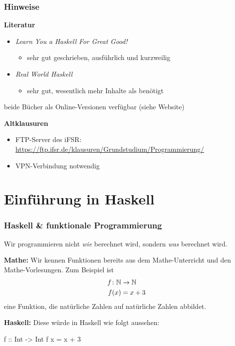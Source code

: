 \documentclass{beamer}
\begin{document}
	\begin{frame} \frametitle{Hinweise}
		\footnotesize
		\textbf{Literatur}
		\begin{itemize}
			\item \textit{Learn You a Haskell For Great Good!}
			\begin{itemize}
				\item sehr gut geschrieben, ausführlich und kurzweilig
			\end{itemize}
			\item \textit{Real World Haskell}
			\begin{itemize}
				\item sehr gut, wesentlich mehr Inhalte als benötigt
			\end{itemize}
		\end{itemize}
		beide Bücher als Online-Versionen verfügbar (siehe Website)
		
		\medskip \pause
		
		\textbf{Altklausuren}
		\begin{itemize}
			\item FTP-Server des iFSR:
			\url{https://ftp.ifsr.de/klausuren/Grundstudium/Programmierung/}
			\item VPN-Verbindung notwendig
		\end{itemize}
	\end{frame}

\section{Einführung in Haskell}

    \begin{frame}[fragile] \frametitle{Haskell \& funktionale Programmierung}
    	\footnotesize
        
        Wir programmieren nicht \textit{wie} berechnet wird, sondern \textit{was} berechnet wird.
    	
    	\pause
        \medskip
        
        \textbf{Mathe:} Wir kennen Funktionen bereits aus dem Mathe-Unterricht und den Mathe-Vorlesungen. Zum Beispiel ist 
        \begin{equation*}
        	\begin{split}
        		f \colon \mathbb{N} &\to \mathbb{N} \\
        		f(x) &= x + 3
        	\end{split}
        \end{equation*}
    	eine Funktion, die natürliche Zahlen auf natürliche Zahlen abbildet.
    	
    	\pause
    	
    	\textbf{Haskell:} 
    	Diese würde in Haskell wie folgt aussehen:
        \begin{codebox}
f :: Int -> Int
f x = x + 3
        \end{codebox}
    \end{frame}
\end{document}
